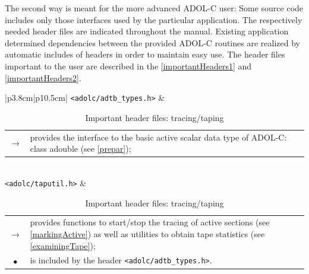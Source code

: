 \documentclass[11pt,twoside]{article}
\begin{document}
The second way is meant for the more advanced ADOL-C user: Some source code
includes only those interfaces used by the particular application. 
The respectively needed header files are indicated
throughout the manual.
Existing application determined dependencies between the provided 
ADOL-C routines are realized by automatic includes of headers in order 
to maintain easy use. The header files important to the user are described
in the \autoref{importantHeaders1} and \autoref{importantHeaders2}.

\begin{table}[h]
\center \small
\begin{tabular}{|p{3.8cm}|p{10.5cm}|}\hline
\verb=<adolc/adtb_types.h>= & 
\begin{tabular*}{10.5cm}{cp{9.5cm}}
  \boldmath $\rightarrow$ \unboldmath
                & provides the interface to the basic active 
                  scalar data type of ADOL-C: {\sf class adouble} 
                  (see \autoref{prepar}); 
\end{tabular*}
\\ \hline
 \verb=<adolc/taputil.h>= & 
\begin{tabular*}{10.5cm}{cp{9.5cm}}
  \boldmath $\rightarrow$ \unboldmath
                & provides functions to start/stop the tracing of
                  active sections (see \autoref{markingActive})
                  as well as utilities to obtain 
                  tape statistics (see \autoref{examiningTape}); \\
  $\bullet$     & is included by the header \verb=<adolc/adtb_types.h>=.
\end{tabular*}
\\ \hline
\end{tabular}
\caption{Important header files: tracing/taping}
\label{importantHeaders1}
\end{table}  
\end{document}
